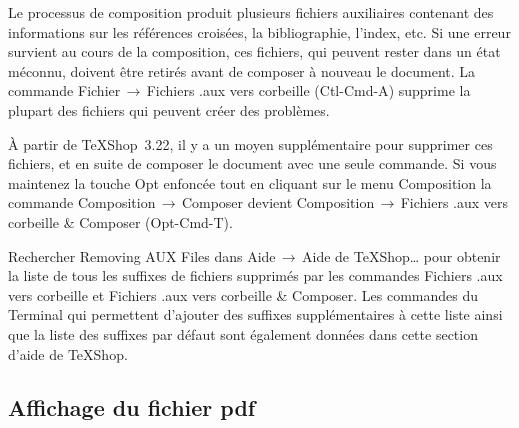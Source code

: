 \documentclass[11pt,french]{article}
\newcommand{\TS}{\textsf{\TeX Shop}}
\newcommand{\acr}[1]{\textsf{#1}}
\newcommand{\cmd}[1]{\textsf{#1}}
\newcommand{\mnu}[1]{\textsf{#1}}
\newcommand{\To}{\,\(\to\)\,}
\begin{document}
%
%

Le processus de composition produit plusieurs fichiers auxiliaires contenant des informations sur les références croisées, la bibliographie, l'index, etc. Si une erreur survient au cours de la composition, ces fichiers, qui peuvent rester dans un état méconnu, doivent être retirés avant de composer à nouveau le document. La commande \mnu{Fichier}\To\mnu{Fichiers .aux vers corbeille} (\cmd{Ctl-Cmd-A}) supprime la plupart des fichiers qui peuvent créer des problèmes. 

À partir de \TS\ 3.22, il y a un moyen supplémentaire pour supprimer ces fichiers, et en suite de composer le document avec une seule commande. Si vous maintenez la touche \cmd{Opt} enfoncée tout en cliquant sur le menu \mnu{Composition} la commande \mnu{Composition}\To\mnu{Composer} devient \mnu{Composition}\To\mnu{Fichiers .aux vers corbeille \& Composer} (\cmd{Opt-Cmd-T}). 

Rechercher \cmd{Removing AUX Files} dans \mnu{Aide}\To\mnu{Aide de TeXShop…} pour obtenir la liste de tous les suffixes de fichiers supprimés par les commandes \mnu{Fichiers .aux vers corbeille} et \mnu{Fichiers .aux vers corbeille \& Composer}. Les commandes du \cmd{Terminal} qui permettent d'ajouter des suffixes supplémentaires à cette liste ainsi que la liste des suffixes par défaut sont également données dans cette section d'aide de \TS.

\subsection{Affichage du fichier \acr{pdf}}
\end{document}
